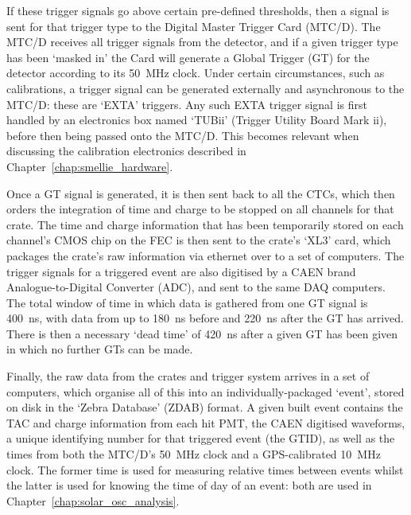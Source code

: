 If these trigger signals go above certain pre-defined thresholds, then a signal is sent for that trigger type to the Digital Master Trigger Card (MTC/D). The MTC/D receives all trigger signals from the detector, and if a given trigger type has been `masked in' the Card will generate a Global Trigger (GT) for the detector according to its \SI{50}{\MHz} clock. Under certain circumstances, such as calibrations, a trigger signal can be generated externally and asynchronous to the MTC/D: these are `EXTA' triggers. Any such EXTA trigger signal is first handled by an electronics box named `TUBii' (Trigger Utility Board Mark ii), before then being passed onto the MTC/D. This becomes relevant when discussing the calibration electronics described in Chapter~\ref{chap:smellie_hardware}.

Once a GT signal is generated, it is then sent back to all the CTCs, which then orders the integration of time and charge to be stopped on all channels for that crate. The time and charge information that has been temporarily stored on each channel's CMOS chip on the FEC is then sent to the crate's `XL3' card, which packages the crate's raw information via ethernet over to a set of computers. The trigger signals for a triggered event are also digitised by a CAEN brand Analogue-to-Digital Converter (ADC), and sent to the same DAQ computers. The total window of time in which data is gathered from one GT signal is \SI{400}{\ns}, with data from up to \SI{180}{\ns} before and \SI{220}{\ns} after the GT has arrived. There is then a necessary `dead time' of \SI{420}{\ns} after a given GT has been given in which no further GTs can be made.

Finally, the raw data from the crates and trigger system arrives in a set of computers, which organise all of this into an individually-packaged `event', stored on disk in the `Zebra Database' (ZDAB) format. A given built event contains the TAC and charge information from each hit PMT, the CAEN digitised waveforms, a unique identifying number for that triggered event (the GTID), as well as the times from both the MTC/D's \SI{50}{\MHz} clock and a GPS-calibrated \SI{10}{\MHz} clock. The former time is used for measuring relative times between events whilst the latter is used for knowing the time of day of an event: both are used in Chapter~\ref{chap:solar_osc_analysis}.



